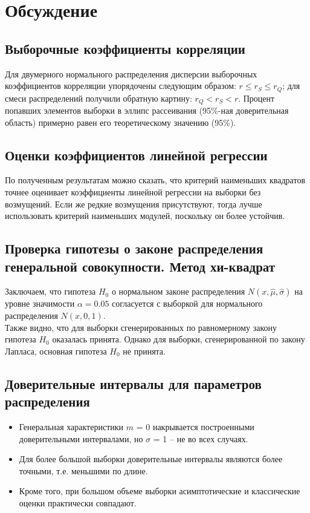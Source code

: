 \section{Обсуждение}
\subsection{Выборочные коэффициенты корреляции}
\noindent Для двумерного нормального распределения дисперсии выборочных коэффициентов корреляции упорядочены следующим образом: $r \leq r_{S} \leq r_{Q}$; для смеси распределений получили обратную картину: $r_{Q} < r_{S} < r$.
\newline
\noindent Процент попавших элементов выборки в эллипс рассеивания (95$\%$-ная доверительная область) примерно равен его теоретическому значению (95$\%$).
\subsection{Оценки коэффициентов линейной регрессии}
\noindent По полученным результатам можно сказать, что критерий наименьших квадратов точнее оценивает коэффициенты линейной регрессии на выборки без возмущений. Если же редкие возмущения присутствуют, тогда лучше использовать критерий наименьших модулей, поскольку он более устойчив.
\subsection{Проверка гипотезы о законе распределения генеральной совокупности. Метод хи-квадрат}

\noindent Заключаем, что гипотеза $H_{0}$ о нормальном законе распределения $N(x,\hat{\mu}, \hat{\sigma})$ на уровне значимости $\alpha = 0.05$ согласуется с выборкой для нормального распределения $N(x, 0, 1)$.
\\
Также видно, что для выборки сгенерированных по равномерному закону гипотеза $H_{0}$ оказалась принята. Однако для выборки, сгенерированной по закону Лапласа, основная гипотеза  $H_{0}$ не принята.
\subsection{Доверительные интервалы для параметров распределения}
\begin{itemize}
	\item Генеральная характеристики $m$ = 0 накрывается построенными доверительными интервалами, но $\sigma$ = 1 -- не во всех случаях.
	\item Для более большой выборки доверительные интервалы являются более точными, т.е. меньшими по длине. 
	\item Кроме того, при большом объеме выборки асимптотические и классические оценки практически совпадают.
\end{itemize}

\newpage
